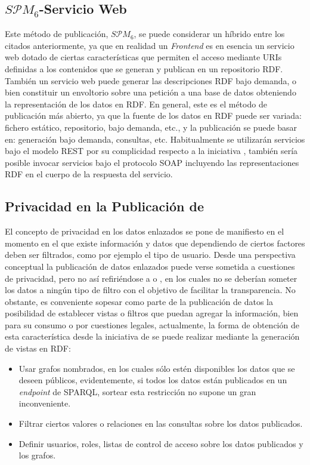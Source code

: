 \clearpage
\subsection{$S\mathcal{P}M_{6}$-Servicio Web}\label{servicio-web-produccion}
Este método de publicación, $S\mathcal{P}M_{6}$, se puede considerar un híbrido
entre los citados anteriormente, ya que en realidad un \linkeddata \textit{Frontend} es en esencia 
un servicio web dotado de ciertas características que permiten el acceso mediante URIs definidas a los contenidos
que se generan y publican en un repositorio \gls{RDF}. También un servicio web puede generar las descripciones
RDF bajo demanda, o bien constituir un envoltorio sobre una petición a una base de datos obteniendo
la representación de los datos en RDF. En general, este es el método de publicación más abierto, 
ya que la fuente de los datos en RDF puede ser variada: fichero estático, repositorio, bajo demanda, etc., 
y la publicación se puede basar en: generación bajo demanda, consultas, etc. Habitualmente se utilizarán
servicios bajo el modelo \gls{REST} por su complicidad respecto a la iniciativa \linkeddata, también sería posible invocar servicios 
bajo el protocolo \gls{SOAP} incluyendo las representaciones RDF en el cuerpo de la respuesta del servicio. 


\subsection{Privacidad en la Publicación de \linkeddata}
El concepto de privacidad en los datos enlazados se pone de manifiesto en el momento
en el que existe información y datos que dependiendo de ciertos factores deben ser filtrados, como por ejemplo el tipo
de usuario. Desde una perspectiva conceptual la publicación de datos
enlazados puede verse sometida a cuestiones de privacidad, pero no así refiriéndose 
a \opendata o \lod, en los cuales no se deberían someter los datos a ningún tipo de filtro
con el objetivo de facilitar la transparencia. No obstante, es conveniente sopesar 
como parte de la publicación de datos la posibilidad de establecer vistas
o filtros que puedan agregar la información, bien para su consumo o por cuestiones
legales, actualmente, la forma de obtención de esta característica desde la iniciativa
de \linkeddata se puede realizar mediante la generación de vistas en \gls{RDF}:

\begin{itemize}
 \item Usar grafos nombrados, en los cuales sólo estén disponibles los datos que se deseen públicos, evidentemente,
si todos los datos están publicados en un \textit{endpoint} de \gls{SPARQL}, sortear esta restricción no supone un gran inconveniente.
\item Filtrar ciertos valores o relaciones en las consultas sobre los datos publicados.
\item Definir usuarios, roles, listas de control de acceso sobre los datos publicados y los grafos.
\end{itemize}

